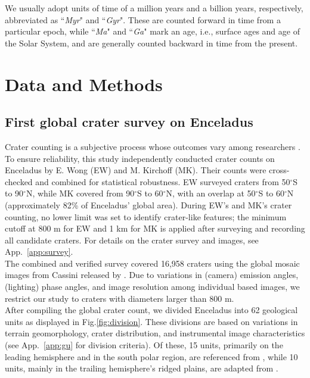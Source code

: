 \documentclass[preprint,12pt,3p,times,authoryear]{elsarticle}
\begin{document}
We usually adopt units of time of a million years and a billion years, respectively, abbreviated as ``{\it Myr}" and ``{\it Gyr}". These are counted forward in time from a particular epoch, while ``{\it Ma}" and ``{\it Ga}" mark an age, i.e., surface ages and age of the Solar System, and are generally counted backward in time from the present.


\section{Data and Methods} 
\label{sec:data}

\subsection{First global crater survey on Enceladus}
\label{subsec:crater_count}
Crater counting is a subjective process whose outcomes vary among researchers \citep{Robbins2014}. To ensure reliability, this study independently conducted crater counts on Enceladus by E. Wong (EW) and M. Kirchoff (MK). Their counts were cross-checked and combined for statistical robustness. EW surveyed craters from 50$^\circ$S to 90$^\circ$N, while MK covered from 90$^\circ$S to 60$^\circ$N, with an overlap at 50$^\circ$S to 60$^\circ$N (approximately 82\% of Enceladus' global area). During EW’s and MK’s crater counting, no lower limit was set to identify crater-like features; the minimum cutoff at 800 m for EW and 1 km for MK is applied after surveying and recording all candidate craters. For details on the crater survey and images, see App.~\ref{app:survey}.\\

The combined and verified survey covered 16,958 craters using the global mosaic images from Cassini released by \citet{Bland2018}. Due to variations in (camera) emission angles, (lighting) phase angles, and image resolution among individual based images, we restrict our study to craters with diameters larger than 800 m. \\

After compiling the global crater count, we divided Enceladus into 62 geological units as displayed in  Fig.\ref{fig:division}. These divisions are based on variations in terrain geomorphology, crater distribution, and instrumental image characteristics (see App.~\ref{app:gu} for division criteria).
Of these, 15 units, primarily on the leading hemisphere and in the south polar region, are referenced from \citet{CrowWillard2015}, while 10 units, mainly in the trailing hemisphere’s ridged plains, are adapted from \citet{Kirchoff2009}. \\
\end{document}
